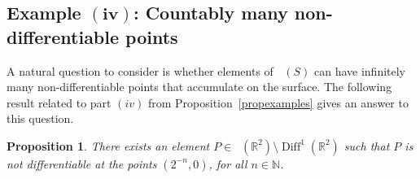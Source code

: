 \documentclass[sn-mathphys-num]{sn-jnl}%
\theoremstyle{thmstyleone}%
\newtheorem{prop}[theorem]{Proposition}%
\theoremstyle{thmstyletwo}%
\theoremstyle{thmstylethree}%
\DeclareMathOperator{\diff}{Diff}
\DeclareMathOperator{\thomeo}{Homeo^{1}}
\begin{document}
\subsection*{Example $\mathbf{(iv)}$: Countably many non-differentiable points}

A natural question to consider is whether elements of $\thomeo(S)$ can have infinitely many non-differentiable points that accumulate on the surface.  The following result related to part $(iv)$ from Proposition~\ref{propexamples} gives an answer to this question. 

\begin{prop}\label{propex4}
There exists an element $P \in\thomeo \!\left(\mathbb{R}^2\right){\setminus}\diff^1\!\left(\mathbb{R}^2\right)$ such that $P$ is not differentiable at the points $\left(2^{-n}, 0 \right)$, for all $n \in \mathbb{N}$. 
\end{prop}
\end{document}
